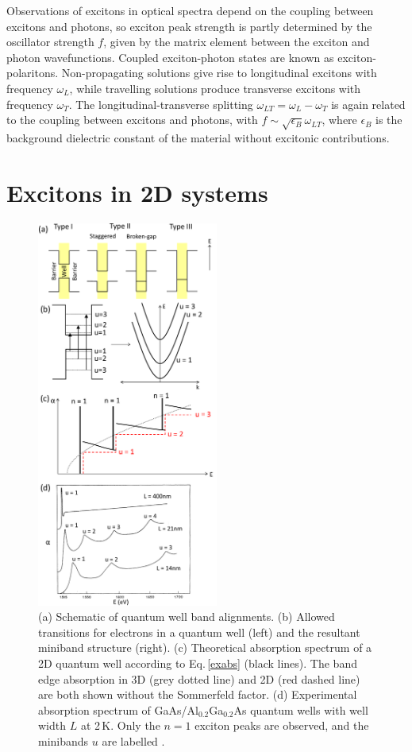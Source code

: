 Observations of excitons in optical spectra depend on the coupling between excitons and photons, so exciton peak strength is partly determined by the oscillator strength $f$, given by the matrix element between the exciton and photon wavefunctions. Coupled exciton-photon states are known as exciton-polaritons. Non-propagating solutions give rise to longitudinal excitons with frequency $\omega_L$, while travelling solutions produce transverse excitons with frequency $\omega_T$. The longitudinal-transverse splitting $\omega_{LT} = \omega_L - \omega_T$ is again related to the coupling between excitons and photons, with $f \sim \sqrt{\epsilon_B} \omega_{LT}$, where $\epsilon_B$ is the background dielectric constant of the material without excitonic contributions.

\section{Excitons in 2D systems}
\label{sec:ex2D}
\begin{figure}[h!] 
\centering    
\includegraphics[width=0.53\textwidth]{Fig2}
\caption{(a) Schematic of quantum well band alignments. (b) Allowed transitions for electrons in a quantum well (left) and the resultant miniband structure (right). (c) Theoretical absorption spectrum of a 2D quantum well according to Eq.\,\ref{exabs} (black lines). The band edge absorption in 3D (grey dotted line) and 2D (red dashed line) are both shown without the Sommerfeld factor. (d) Experimental absorption spectrum of GaAs/Al$_{0.2}$Ga$_{0.2}$As quantum wells with well width $L$ at 2\,K. Only the $n=1$ exciton peaks are observed, and the minibands $u$ are labelled \cite{Dingle1974}.}
\label{2Fig2}
\end{figure}
